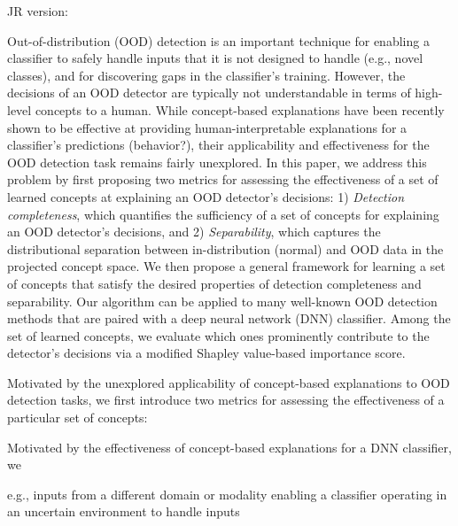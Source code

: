 JR version:

Out-of-distribution (OOD) detection is an important technique for enabling a classifier to safely handle inputs that it is not designed to handle (e.g., novel classes), and for discovering gaps in the classifier's training.
However, the decisions of an OOD detector are typically not understandable in terms of high-level concepts to a human.
While concept-based explanations have been recently shown to be effective at providing human-interpretable explanations for a classifier's predictions (behavior?), their applicability and effectiveness for the OOD detection task remains fairly unexplored.
In this paper, we address this problem by first proposing two metrics for assessing the effectiveness of a set of learned concepts at explaining an OOD detector's decisions: 1) \textit{Detection completeness}, which quantifies the sufficiency of a set of concepts for explaining an OOD detector's decisions, and 2) \textit{Separability}, which captures the distributional separation between in-distribution (normal) and OOD data in the projected concept space.
We then propose a general framework for learning a set of concepts that satisfy the desired properties of detection completeness and separability. 
Our algorithm can be applied to many well-known OOD detection methods that are paired with a deep neural network (DNN) classifier.
Among the set of learned concepts, we evaluate which ones prominently contribute to the detector's decisions via a modified Shapley value-based importance score.




Motivated by the unexplored applicability of concept-based explanations to OOD detection tasks, we first introduce two metrics for assessing the effectiveness of a particular set of concepts:

Motivated by the effectiveness of concept-based explanations for a DNN classifier, we 

e.g., inputs from a different domain or modality
enabling a classifier operating in an uncertain environment to handle inputs
 

\fi
